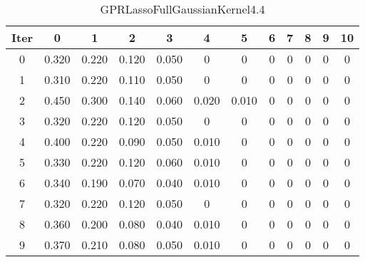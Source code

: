 \begin{table}
	\begin{center}
		\begin{tabular}{|c|c|c|c|c|c|c|c|c|c|c|c|}
			\hline
			Iter & 0 & 1 & 2 & 3 & 4 & 5 & 6 & 7 & 8 & 9 & 10 \\
			\hline
			0 & 0.320 & 0.220 & 0.120 & 0.050 & 0 & 0 & 0 & 0 & 0 & 0 & 0 \\
			\hline
			1 & 0.310 & 0.220 & 0.110 & 0.050 & 0 & 0 & 0 & 0 & 0 & 0 & 0 \\
			\hline
			2 & 0.450 & 0.300 & 0.140 & 0.060 & 0.020 & 0.010 & 0 & 0 & 0 & 0 & 0 \\
			\hline
			3 & 0.320 & 0.220 & 0.120 & 0.050 & 0 & 0 & 0 & 0 & 0 & 0 & 0 \\
			\hline
			4 & 0.400 & 0.220 & 0.090 & 0.050 & 0.010 & 0 & 0 & 0 & 0 & 0 & 0 \\
			\hline
			5 & 0.330 & 0.220 & 0.120 & 0.060 & 0.010 & 0 & 0 & 0 & 0 & 0 & 0 \\
			\hline
			6 & 0.340 & 0.190 & 0.070 & 0.040 & 0.010 & 0 & 0 & 0 & 0 & 0 & 0 \\
			\hline
			7 & 0.320 & 0.220 & 0.120 & 0.050 & 0 & 0 & 0 & 0 & 0 & 0 & 0 \\
			\hline
			8 & 0.360 & 0.200 & 0.080 & 0.040 & 0.010 & 0 & 0 & 0 & 0 & 0 & 0 \\
			\hline
			9 & 0.370 & 0.210 & 0.080 & 0.050 & 0.010 & 0 & 0 & 0 & 0 & 0 & 0 \\
			\hline
		\end{tabular}
	\end{center}
	\caption{GPRLassoFullGaussianKernel4.4}
\end{table}